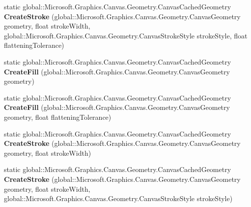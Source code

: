 \begin{DoxyCompactItemize}
static global\+::\+Microsoft.\+Graphics.\+Canvas.\+Geometry.\+Canvas\+Cached\+Geometry {\bfseries Create\+Stroke} (global\+::\+Microsoft.\+Graphics.\+Canvas.\+Geometry.\+Canvas\+Geometry geometry, float stroke\+Width, global\+::\+Microsoft.\+Graphics.\+Canvas.\+Geometry.\+Canvas\+Stroke\+Style stroke\+Style, float flattening\+Tolerance)
\item 
\mbox{\label{class_microsoft_1_1_graphics_1_1_canvas_1_1_geometry_1_1_canvas_cached_geometry_af7e1928aa632df9afaf353ce0742c681}} 
static global\+::\+Microsoft.\+Graphics.\+Canvas.\+Geometry.\+Canvas\+Cached\+Geometry {\bfseries Create\+Fill} (global\+::\+Microsoft.\+Graphics.\+Canvas.\+Geometry.\+Canvas\+Geometry geometry)
\item 
\mbox{\label{class_microsoft_1_1_graphics_1_1_canvas_1_1_geometry_1_1_canvas_cached_geometry_a2c9216474020d5f402b1611e0163c891}} 
static global\+::\+Microsoft.\+Graphics.\+Canvas.\+Geometry.\+Canvas\+Cached\+Geometry {\bfseries Create\+Fill} (global\+::\+Microsoft.\+Graphics.\+Canvas.\+Geometry.\+Canvas\+Geometry geometry, float flattening\+Tolerance)
\item 
\mbox{\label{class_microsoft_1_1_graphics_1_1_canvas_1_1_geometry_1_1_canvas_cached_geometry_a4f114bf6d46b1633a620e968a8a06653}} 
static global\+::\+Microsoft.\+Graphics.\+Canvas.\+Geometry.\+Canvas\+Cached\+Geometry {\bfseries Create\+Stroke} (global\+::\+Microsoft.\+Graphics.\+Canvas.\+Geometry.\+Canvas\+Geometry geometry, float stroke\+Width)
\item 
\mbox{\label{class_microsoft_1_1_graphics_1_1_canvas_1_1_geometry_1_1_canvas_cached_geometry_a633b11623db3794a3d6109c028ed844f}} 
static global\+::\+Microsoft.\+Graphics.\+Canvas.\+Geometry.\+Canvas\+Cached\+Geometry {\bfseries Create\+Stroke} (global\+::\+Microsoft.\+Graphics.\+Canvas.\+Geometry.\+Canvas\+Geometry geometry, float stroke\+Width, global\+::\+Microsoft.\+Graphics.\+Canvas.\+Geometry.\+Canvas\+Stroke\+Style stroke\+Style)
\item 
\mbox{\label{class_microsoft_1_1_graphics_1_1_canvas_1_1_geometry_1_1_canvas_cached_geometry_ae99898b363893b988831d61f23817ef5}} 

\end{DoxyCompactItemize}
